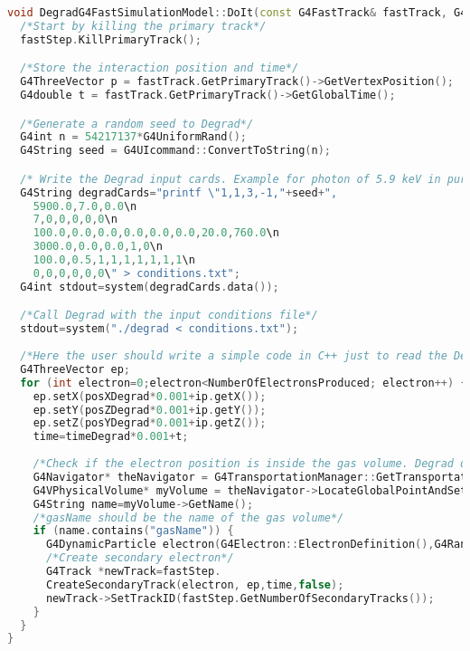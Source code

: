 \documentclass[preprint,12pt,sort&compress]{elsarticle}
\begin{document}
\newpage

\begin{lstlisting}[label=code_degrad, caption=DoIt() method for Degrad.,language=C++]
void DegradG4FastSimulationModel::DoIt(const G4FastTrack& fastTrack, G4FastStep& fastStep) {
  /*Start by killing the primary track*/
  fastStep.KillPrimaryTrack();

  /*Store the interaction position and time*/
  G4ThreeVector p = fastTrack.GetPrimaryTrack()->GetVertexPosition();
  G4double t = fastTrack.GetPrimaryTrack()->GetGlobalTime();

  /*Generate a random seed to Degrad*/
  G4int n = 54217137*G4UniformRand();
  G4String seed = G4UIcommand::ConvertToString(n);

  /* Write the Degrad input cards. Example for photon of 5.9 keV in pure Xenon (thermalization energy of 7.0 eV), in a 3000.0 V/cm electric field anti-parallel to the photon direction. The gas was considered to be at 20 degrees C and 760 Torr. For details see Degrad source file */
  G4String degradCards="printf \"1,1,3,-1,"+seed+",
    5900.0,7.0,0.0\n
    7,0,0,0,0,0\n
    100.0,0.0,0.0,0.0,0.0,0.0,20.0,760.0\n
    3000.0,0.0,0.0,1,0\n
    100.0,0.5,1,1,1,1,1,1,1\n
    0,0,0,0,0,0\" > conditions.txt";
  G4int stdout=system(degradCards.data());

  /*Call Degrad with the input conditions file*/
  stdout=system("./degrad < conditions.txt"); 
  
  /*Here the user should write a simple code in C++ just to read the Degrad ASCII file and get the electrons position and thermalization time. Remember that Degrad makes all interactions in (x0,y0,z0)=(0,0,0) and t0=0: the returned positions should be shifted according to interaction position and interaction time. Moreover, the Y and Z axes are swapped in Degrad relatively to Geant4. Distance units in Degrad are um and time is ps, whereas Geant4 uses mm and ns.*/
  G4ThreeVector ep;
  for (int electron=0;electron<NumberOfElectronsProduced; electron++) {
    ep.setX(posXDegrad*0.001+ip.getX());
    ep.setY(posZDegrad*0.001+ip.getY());
    ep.setZ(posYDegrad*0.001+ip.getZ());
    time=timeDegrad*0.001+t;
   
    /*Check if the electron position is inside the gas volume. Degrad does not use geometrical constraints*/
    G4Navigator* theNavigator = G4TransportationManager::GetTransportationManager()->GetNavigatorForTracking();
    G4VPhysicalVolume* myVolume = theNavigator->LocateGlobalPointAndSetup(myPoint); 
    G4String name=myVolume->GetName();
    /*gasName should be the name of the gas volume*/
    if (name.contains("gasName")) { 
      G4DynamicParticle electron(G4Electron::ElectronDefinition(),G4RandomDirection(),thermalizationEnergy*eV); 
      /*Create secondary electron*/
      G4Track *newTrack=fastStep.
      CreateSecondaryTrack(electron, ep,time,false);
      newTrack->SetTrackID(fastStep.GetNumberOfSecondaryTracks());
    }
  }
}
\end{lstlisting}
\end{document}
